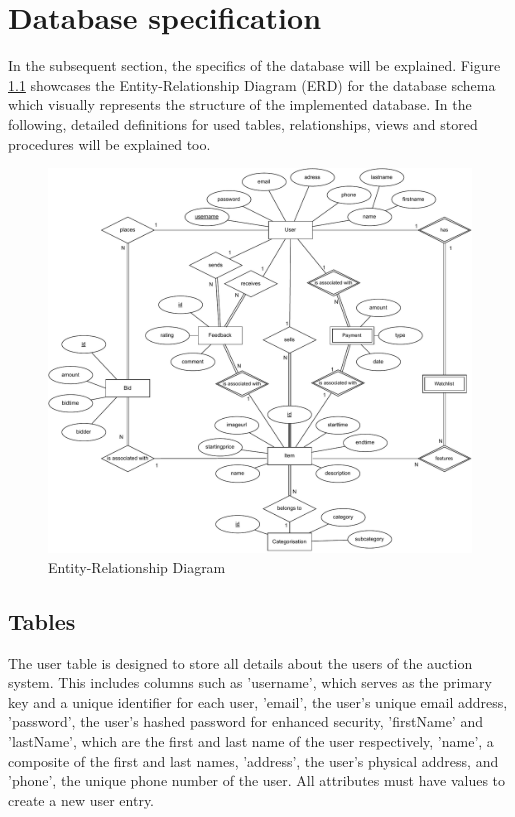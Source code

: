 \chapter{Database specification}

In the subsequent section, the specifics of the database will be explained. Figure \ref{fig:erd-chen} showcases the Entity-Relationship Diagram (ERD) for the database schema which visually represents the structure of the implemented database. In the following, detailed definitions for used tables, relationships, views and stored procedures will be explained too.

\begin{figure}[htbp]
	\centering
	\includegraphics[width=0.7\textheight]{img/ERD-Chen.pdf}
	\caption{Entity-Relationship Diagram}
	\label{fig:erd-chen}
\end{figure}

\section{Tables}

The user table is designed to store all details about the users of the auction system. This includes columns such as 'username', which serves as the primary key and a unique identifier for each user, 'email', the user's unique email address, 'password', the user's hashed password for enhanced security, 'firstName' and 'lastName', which are the first and last name of the user respectively, 'name', a composite of the first and last names, 'address', the user's physical address, and 'phone', the unique phone number of the user. All attributes must have values to create a new user entry.

